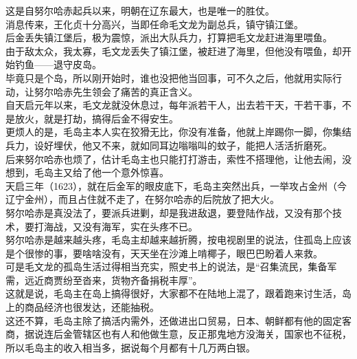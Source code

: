 \begin{multicols}{\theparacolNo}
这是自努尔哈赤起兵以来，明朝在辽东最大，也是唯一的胜仗。\\

消息传来，王化贞十分高兴，当即任命毛文龙为副总兵，镇守镇江堡。\\

后金丢失镇江堡后，极为震惊，派出大队兵力，打算把毛文龙赶进海里喂鱼。\\

由于敌太众，我太寡，毛文龙丢失了镇江堡，被赶进了海里，但他没有喂鱼，却开始钓鱼——退守皮岛。\\

毕竟只是个岛，所以刚开始时，谁也没把他当回事，可不久之后，他就用实际行动，让努尔哈赤先生领会了痛苦的真正含义。\\

自天启元年以来，毛文龙就没休息过，每年派若干人，出去若干天，干若干事，不是放火，就是打劫，搞得后金不得安生。\\

更烦人的是，毛岛主本人实在狡猾无比，你没有准备，他就上岸踢你一脚，你集结兵力，设好埋伏，他又不来，就如同耳边嗡嗡叫的蚊子，能把人活活折磨死。\\

后来努尔哈赤也烦了，估计毛岛主也只能打打游击，索性不搭理他，让他去闹，没想到，毛岛主又给了他一个意外惊喜。\\

天启三年（1623），就在后金军的眼皮底下，毛岛主突然出兵，一举攻占金州（今辽宁金州），而且占住就不走了，在努尔哈赤的后院放了把大火。\\

努尔哈赤是真没法了，要派兵进剿，却是我进敌退，要登陆作战，又没有那个技术，要打海战，又没有海军，实在头疼不已。\\

努尔哈赤是越来越头疼，毛岛主却越来越折腾，按电视剧里的说法，住孤岛上应该是个很惨的事，要啥啥没有，天天坐在沙滩上啃椰子，眼巴巴盼着人来救。\\

可是毛文龙的孤岛生活过得相当充实，照史书上的说法，是“召集流民，集备军需，远近商贾纷至沓来，货物齐备捐税丰厚”。\\

这就是说，毛岛主在岛上搞得很好，大家都不在陆地上混了，跟着跑来讨生活，岛上的商品经济也很发达，还能抽税。\\

这还不算，毛岛主除了搞活内需外，还做进出口贸易，日本、朝鲜都有他的固定客商，据说连后金管辖区也有人和他做生意，反正那鬼地方没海关，国家也不征税，所以毛岛主的收入相当多，据说每个月都有十几万两白银。\\


\end{multicols}
